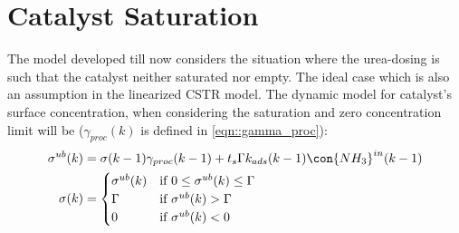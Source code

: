 \newpage
\section{Catalyst Saturation}

The model developed till now considers the situation where the urea-dosing is such that the catalyst neither saturated
nor empty. The ideal case which is also an assumption in the linearized CSTR model. The dynamic model for catalyst's
surface concentration, when considering the saturation and zero concentration limit will be ($\gamma_{proc}(k)$ is
defined in \ref{eqn::gamma_proc}):
\begin{align}
        \sigma^{ub}(k) &= \sigma (k-1) \gamma_{proc}(k-1) + t_s \Gamma k_{ads}(k-1) \con{NH_3}^{in}(k-1)
        \label{eqn::unbounded_sigma_mdl}\\
        \sigma(k) &= \begin{cases}
                                \sigma^{ub}(k) & \text{if }  0 \leq \sigma^{ub}(k) \leq \Gamma\\
                                \Gamma         & \text{if }  \sigma^{ub}(k) > \Gamma \\
                                0              & \text{if }  \sigma^{ub}(k) < 0
                        \end{cases}
        \label{eqn::actual_sigma_mdl}
\end{align}

